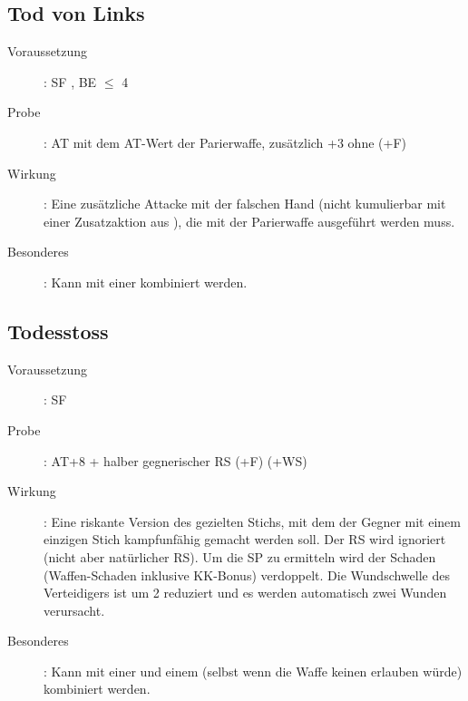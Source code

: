 \subsection{Tod von Links }
\label{chap.bAT.tod}
\begin{description}
    \item[Voraussetzung]: SF , BE\textrm{ ${\leq}$
        }4
    \item[Probe]: AT mit dem AT-Wert der Parierwaffe, zusätzlich +3 ohne
         (+F)
    \item[Wirkung]: Eine zusätzliche Attacke mit der falschen Hand (nicht
        kumulierbar mit einer Zusatzaktion aus ), die mit der Parierwaffe ausgeführt werden muss.
    \item[Besonderes]: Kann mit einer  kombiniert werden.
\end{description}

\subsection{Todesstoss }
\begin{description}
    \item[Voraussetzung]: SF 
    \item[Probe]: AT+8 + halber gegnerischer RS (+F) (+WS)
    \item[Wirkung]: Eine riskante Version des gezielten Stichs, mit dem der
        Gegner mit einem einzigen Stich kampfunfähig gemacht werden soll. Der
        RS wird ignoriert (nicht aber natürlicher RS).  Um die SP zu ermitteln
        wird der Schaden (Waffen-Schaden inklusive KK-Bonus) verdoppelt. Die
        Wundschwelle des Verteidigers ist um 2 reduziert und es werden
        automatisch zwei Wunden verursacht.
    \item[Besonderes]: Kann mit einer  und einem
         (selbst wenn die Waffe keinen
         erlauben würde) kombiniert werden.
\end{description}

